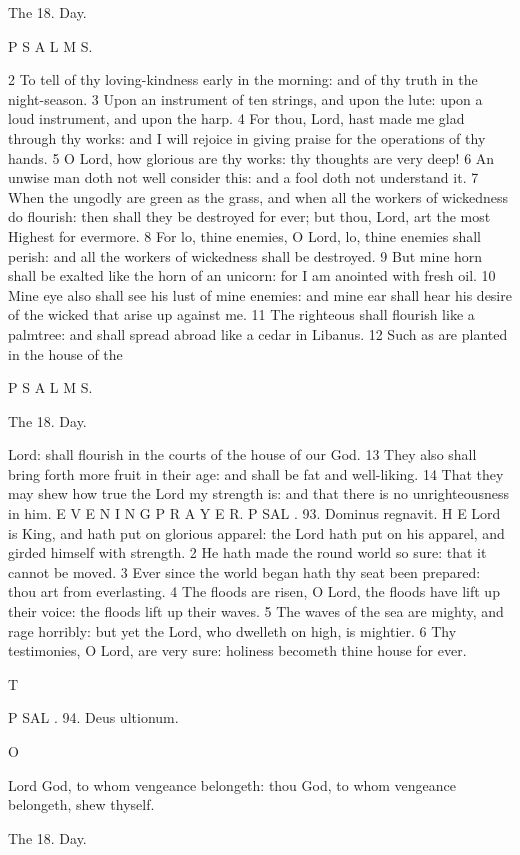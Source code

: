 The 18. Day.

P S A L M S.

2 To tell of thy loving-kindness early in the morning: and of thy truth in the night-season. 3 Upon an instrument of ten strings, and upon the lute: upon a loud instrument, and upon the harp. 4 For thou, Lord, hast made me glad through thy works: and I will rejoice in giving praise for the operations of thy hands. 5 O Lord, how glorious are thy works: thy thoughts are very deep! 6 An unwise man doth not well consider this: and a fool doth not understand it. 7 When the ungodly are green as the grass, and when all the workers of wickedness do flourish: then shall they be destroyed for ever; but thou, Lord, art the most Highest for evermore. 8 For lo, thine enemies, O Lord, lo, thine enemies shall perish: and all the workers of wickedness shall be destroyed. 9 But mine horn shall be exalted like the horn of an unicorn: for I am anointed with fresh oil. 10 Mine eye also shall see his lust of mine enemies: and mine ear shall hear his desire of the wicked that arise up against me. 11 The righteous shall flourish like a palmtree: and shall spread abroad like a cedar in Libanus. 12 Such as are planted in the house of the

P S A L M S.

The 18. Day.

Lord: shall flourish in the courts of the house of our God. 13 They also shall bring forth more fruit in their age: and shall be fat and well-liking. 14 That they may shew how true the Lord my strength is: and that there is no unrighteousness in him. E V E N I N G P R A Y E R. P SAL . 93. Dominus regnavit. H E Lord is King, and hath put on glorious apparel: the Lord hath put on his apparel, and girded himself with strength. 2 He hath made the round world so sure: that it cannot be moved. 3 Ever since the world began hath thy seat been prepared: thou art from everlasting. 4 The floods are risen, O Lord, the floods have lift up their voice: the floods lift up their waves. 5 The waves of the sea are mighty, and rage horribly: but yet the Lord, who dwelleth on high, is mightier. 6 Thy testimonies, O Lord, are very sure: holiness becometh thine house for ever.

T

P SAL . 94. Deus ultionum.

O

Lord God, to whom vengeance belongeth: thou God, to whom vengeance belongeth, shew thyself.

The 18. Day.

